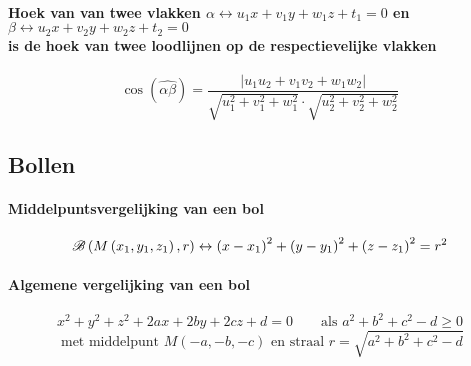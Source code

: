 \paragraph{Hoek van van twee vlakken $\alpha \leftrightarrow u_1 x + v_1 y + w_1 z + t_1 = 0$ en $\beta  \leftrightarrow u_2 x + v_2 y + w_2 z + t_2 = 0$ \\ is de hoek van twee loodlijnen op de respectievelijke vlakken}
\label{sec:HoekVlakken}
    \[
      \cos\left(\widehat{\alpha\beta} \right) = \frac {\left| u_1 u_2 + v_1 v_2 + w_1 w_2\right|}%
                                             {\sqrt{u_1^2 + v_1^2 + w_1^2} \cdot \sqrt{u_2^2 + v_2^2 + w_2^2}}
    \]
    
    
      
\subsection{Bollen}
\label{sec:Bollen}

\paragraph{Middelpuntsvergelijking van een bol}
\label{sec:MiddelpuntsvergelijkingBol}
   \[
     \mathscr{B}\left(M\left(x_1,y_1,z_1\right),r\right)
     \leftrightarrow
     \left(x-x_1\right)^2+\left(y-y_1\right)^2+\left(z-z_1\right)^2 = r^2
   \]
   
\paragraph{Algemene vergelijking van een bol}
\label{sec:BolVergelijking}
   \[
     x^2 + y^2 + z^2 + 2ax + 2by + 2 cz + d = 0 \qquad \textrm{als } a^2 + b^2 + c^2 - d \geq 0
   \]
   \[
     \textrm{ met middelpunt } M\left(-a,-b,-c\right) \textrm{ en straal } r = \sqrt{a^2 + b^2 + c^2 - d}
   \]
   
 
